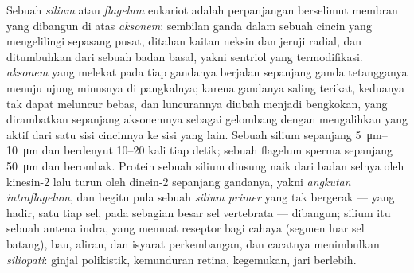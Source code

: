 \begin{definition}\label{def:b3:cytoskeleton-motility:cilia}
%
Sebuah \emph{silium} atau \emph{flagelum} eukariot adalah perpanjangan
berselimut membran yang dibangun di atas \emph{aksonem}: sembilan 
ganda dalam sebuah cincin yang mengelilingi sepasang pusat, ditahan kaitan
neksin dan jeruji radial, dan ditumbuhkan dari sebuah badan basal, yakni
sentriol yang termodifikasi. \emph{ aksonem} yang melekat pada tiap
gandanya berjalan sepanjang ganda tetangganya menuju ujung minusnya di
pangkalnya; karena gandanya saling terikat, keduanya tak dapat meluncur bebas,
dan luncurannya diubah menjadi bengkokan, yang dirambatkan sepanjang aksonemnya
sebagai gelombang dengan mengalihkan  yang aktif dari satu sisi cincinnya
ke sisi yang lain. Sebuah silium sepanjang \qtyrange{5}{10}{\micro m}
dan berdenyut \numrange{10}{20} kali tiap detik; sebuah flagelum sperma
sepanjang \qty{50}{\micro m} dan berombak. Protein sebuah silium diusung naik
dari badan selnya oleh kinesin-2 lalu turun oleh dinein-2 sepanjang gandanya,
yakni \emph{angkutan intraflagelum}, dan begitu pula sebuah \emph{silium
primer} yang tak bergerak --- yang hadir, satu tiap sel, pada sebagian besar
sel vertebrata --- dibangun; silium itu sebuah antena indra, yang memuat
reseptor bagi cahaya (segmen luar sel batang), bau, aliran, dan isyarat
perkembangan, dan cacatnya menimbulkan \emph{siliopati}: ginjal polikistik,
kemunduran retina, kegemukan, jari berlebih.
\end{definition}

